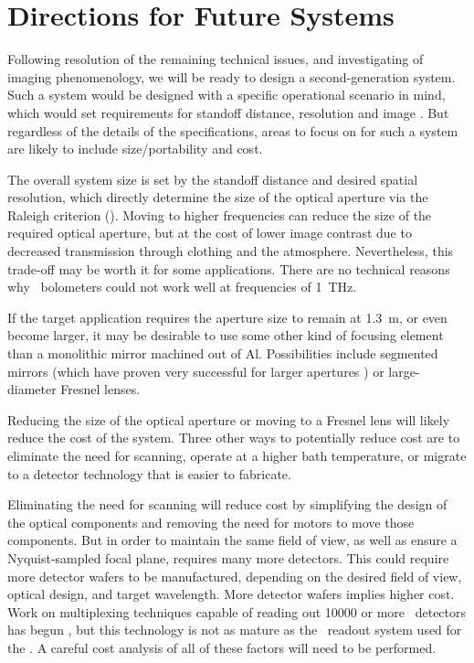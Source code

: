 \section{Directions for Future Systems}

Following resolution of the remaining technical issues, and investigating of imaging phenomenology, we will be ready to design a second-generation system.
Such a system would be designed with a specific operational scenario in mind, which would set requirements for standoff distance, resolution and image \NETD.
But regardless of the details of the specifications, areas to focus on for such a system are likely to include size/portability and cost.

The overall system size is set by the standoff distance and desired spatial resolution, which directly determine the size of the optical aperture via the Raleigh criterion ().
Moving to higher frequencies can reduce the size of the required optical aperture, but at the cost of lower image contrast due to decreased transmission through clothing and the atmosphere.
Nevertheless, this trade-off may be worth it for some applications.
There are no technical reasons why \TES\ bolometers could not work well at frequencies of \SI{1}{\THz}.

If the target application requires the aperture size to remain at \SI{1.3}{\m}, or even become larger, it may be desirable to use some other kind of focusing element than a monolithic mirror machined out of Al.
Possibilities include segmented mirrors (which have proven very successful for larger apertures \cite{stp, act}) or large-diameter Fresnel lenses.

Reducing the size of the optical aperture or moving to a Fresnel lens will likely reduce the cost of the system.
Three other ways to potentially reduce cost are to eliminate the need for scanning, operate at a higher bath temperature, or migrate to a detector technology that is easier to fabricate.

Eliminating the need for scanning will reduce cost by simplifying the design of the optical components and removing the need for motors to move those components.
But in order to maintain the same field of view, as well as ensure a Nyquist-sampled focal plane, requires many more detectors.
This could require more detector wafers to be manufactured, depending on the desired field of view, optical design, and target wavelength.
More detector wafers implies higher cost.
Work on multiplexing techniques capable of reading out \num{10000} or more \TES\ detectors has begun \cite{irwin_advanced_2012}, but this technology is not as mature as the \TDM\ readout system used for the \Imager.
A careful cost analysis of all of these factors will need to be performed.

